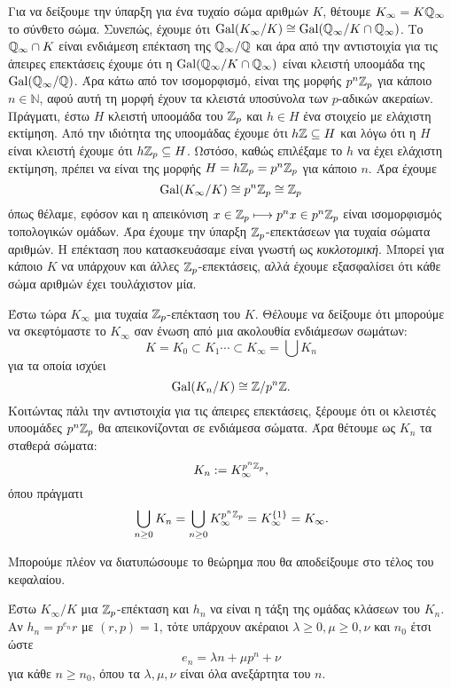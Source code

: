 Για να δείξουμε την ύπαρξη για ένα τυχαίο σώμα αριθμών $K$, θέτουμε $K_\infty = K\mathbb{Q}_\infty$ το σύνθετο σώμα. Συνεπώς, έχουμε ότι 
$\operatorname{Gal}(K_\infty/K)\cong \operatorname{Gal}(\mathbb{Q}_\infty/K\cap \mathbb{Q}_\infty)$. Το $\mathbb{Q}_\infty\cap K$ είναι ενδιάμεση επέκταση της $\mathbb{Q}_\infty/\mathbb{Q}$ και άρα από την αντιστοιχία 
 για τις άπειρες επεκτάσεις έχουμε ότι η $\operatorname{Gal}(\mathbb{Q}_\infty/K\cap\mathbb{Q}_\infty)$ είναι κλειστή υποομάδα της 
$\operatorname{Gal}(\mathbb{Q}_\infty/\mathbb{Q})$. Άρα κάτω από τον ισομορφισμό, είναι της μορφής $p^n\mathbb{Z}_p$ για κάποιο $n \in \mathbb{N}$, αφού αυτή τη μορφή έχουν τα κλειστά υποσύνολα των $p$-αδικών ακεραίων. 
Πράγματι, έστω $H$ κλειστή υποομάδα του $\mathbb{Z}_p$ και $h \in H$ ένα στοιχείο με ελάχιστη εκτίμηση. Από την ιδιότητα της υποομάδας έχουμε 
ότι $h\mathbb{Z} \subseteq H$ και λόγω ότι η $H$ είναι κλειστή έχουμε ότι $h\mathbb{Z}_p\subseteq H$. Ωστόσο, καθώς επιλέξαμε το $h$ να έχει ελάχιστη εκτίμηση, πρέπει να είναι της μορφής $H=h\mathbb{Z}_p = p^n\mathbb{Z}_p$ για κάποιο $n$. Άρα έχουμε
$$\operatorname{Gal}(K_\infty/K) \cong p^n\mathbb{Z}_p \cong \mathbb{Z}_p$$ 
όπως θέλαμε, εφόσον και η απεικόνιση $x \in \mathbb{Z}_p \longmapsto p^n x \in p^n \mathbb{Z}_p$ είναι ισομορφισμός τοπολογικών ομάδων. Άρα έχουμε την ύπαρξη $\mathbb{Z}_p$-επεκτάσεων για τυχαία σώματα αριθμών. Η επέκταση που κατασκευάσαμε είναι γνωστή ως {\em κυκλοτομική}. Μπορεί για κάποιο $K$ να υπάρχουν και άλλες $\mathbb{Z}_p$-επεκτάσεις, αλλά έχουμε εξασφαλίσει ότι κάθε σώμα αριθμών έχει τουλάχιστον μία.


Έστω τώρα $K_\infty$ μια τυχαία $\mathbb{Z}_p$-επέκταση του $K$. Θέλουμε να δείξουμε ότι μπορούμε να σκεφτόμαστε το $K_\infty$ σαν ένωση από μια ακολουθία ενδιάμεσων σωμάτων:
$$K=K_0 \subset K_1 \cdots \subset K_\infty = \bigcup K_n$$
για τα οποία ισχύει 
$$\operatorname{Gal}(K_n/K)\cong \mathbb{Z}/p^n \mathbb{Z}.$$
Κοιτώντας πάλι την αντιστοιχία  για τις άπειρες επεκτάσεις, ξέρουμε ότι οι κλειστές υποομάδες $p^n\mathbb{Z}_p$ θα απεικονίζονται σε ενδιάμεσα σώματα. Άρα θέτουμε ως $K_n$ τα σταθερά σώματα:
$$K_n := K_\infty^{p^n \mathbb{Z}_p},$$
όπου πράγματι 
$$\bigcup\limits_{n\geq 0}K_n = \bigcup\limits_{n\geq 0 } K_\infty^{p^n\mathbb{Z}_p} = K_\infty^{\{1\}} = K_\infty .$$


\noindent Μπορούμε πλέον να διατυπώσουμε το θεώρημα που θα αποδείξουμε στο τέλος του κεφαλαίου.

\begin{theorem}[\tl{Iwasawa}] \label{theorem4.1}
	Έστω $K_\infty/K$ μια $\mathbb{Z}_p$-επέκταση και $h_n$ να είναι η τάξη της ομάδας κλάσεων του $K_n$. Αν $h_n = p^{e_n}r$ με  $(r,p)=1$, τότε υπάρχουν 
	ακέραιοι $\lambda \geq 0, \mu \geq 0, \nu$ και $n_0$ έτσι ώστε
	$$e_n = \lambda n + \mu p^n + \nu$$ για κάθε $n\geq n_0$, όπου τα $\lambda,\mu,\nu$ είναι όλα ανεξάρτητα του $n$. 
\end{theorem}






